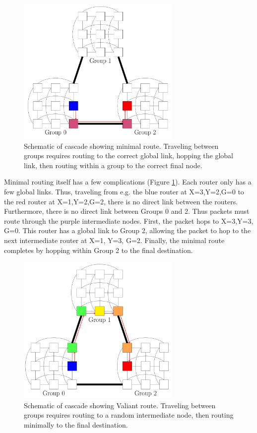 \begin{figure}[h!]
\centering
\includegraphics[width=0.7\textwidth]{figures/tikz/cascade/cascademinroute.png}
\caption{Schematic of cascade showing minimal route. Traveling between groups requires routing to the correct global link, hopping the global link, then routing within a group to the correct final node.}
\label{fig:topologies:cascademinroute}
\end{figure}

Minimal routing itself has a few complications (Figure \ref{fig:topologies:cascademinroute}).
Each router only has a few global links.  
Thus, traveling from e.g. the blue router at X=3,Y=2,G=0 to the red router at X=1,Y=2,G=2, there is no direct link between the routers.
Furthermore, there is no direct link between Groups 0 and 2.
Thus packets must route through the purple intermediate nodes.
First, the packet hops to X=3,Y=3, G=0.  
This router has a global link to Group 2, allowing the packet to hop to the next intermediate router at X=1, Y=3, G=2.
Finally, the minimal route completes by hopping within Group 2 to the final destination.

\begin{figure}[h!]
\centering
\includegraphics[width=0.7\textwidth]{figures/tikz/cascade/cascadevaliant.png}
\caption{Schematic of cascade showing Valiant route. Traveling between groups requires routing to a random intermediate node, then routing minimally to the final destination.}
\label{fig:topologies:cascadevaliantroute}
\end{figure}

